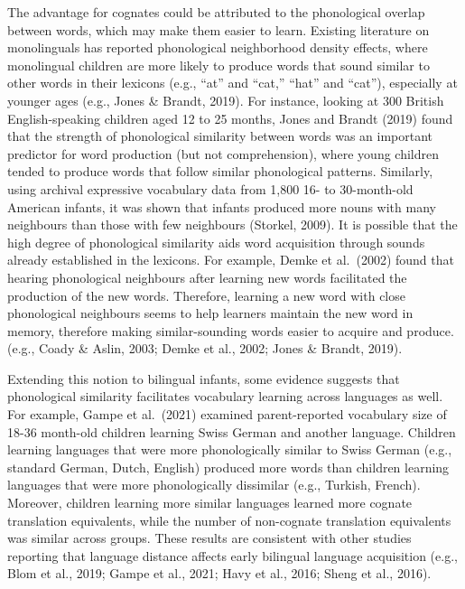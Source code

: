 \documentclass[
  english,
  ,man,floatsintext]{apa6}
\begin{document}
The advantage for cognates could be attributed to the phonological overlap between words, which may make them easier to learn. Existing literature on monolinguals has reported phonological neighborhood density effects, where monolingual children are more likely to produce words that sound similar to other words in their lexicons (e.g., ``at'' and ``cat,'' ``hat'' and ``cat''), especially at younger ages (e.g., Jones \& Brandt, 2019). For instance, looking at 300 British English-speaking children aged 12 to 25 months, Jones and Brandt (2019) found that the strength of phonological similarity between words was an important predictor for word production (but not comprehension), where young children tended to produce words that follow similar phonological patterns. Similarly, using archival expressive vocabulary data from 1,800 16- to 30-month-old American infants, it was shown that infants produced more nouns with many neighbours than those with few neighbours (Storkel, 2009). It is possible that the high degree of phonological similarity aids word acquisition through sounds already established in the lexicons. For example, Demke et al.~(2002) found that hearing phonological neighbours after learning new words facilitated the production of the new words. Therefore, learning a new word with close phonological neighbours seems to help learners maintain the new word in memory, therefore making similar-sounding words easier to acquire and produce. (e.g., Coady \& Aslin, 2003; Demke et al., 2002; Jones \& Brandt, 2019).

Extending this notion to bilingual infants, some evidence suggests that phonological similarity facilitates vocabulary learning across languages as well. For example, Gampe et al.~(2021) examined parent-reported vocabulary size of 18-36 month-old children learning Swiss German and another language. Children learning languages that were more phonologically similar to Swiss German (e.g., standard German, Dutch, English) produced more words than children learning languages that were more phonologically dissimilar (e.g., Turkish, French). Moreover, children learning more similar languages learned more cognate translation equivalents, while the number of non-cognate translation equivalents was similar across groups. These results are consistent with other studies reporting that language distance affects early bilingual language acquisition (e.g., Blom et al., 2019; Gampe et al., 2021; Havy et al., 2016; Sheng et al., 2016).
\end{document}
